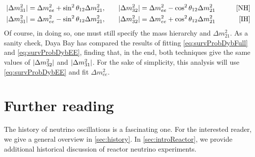 \documentclass[../thesis.tex]{subfiles}
\begin{document}
\begin{align}
  \lvert \Delta m^2_{31}\rvert = \Delta m^2_{ee} + \sin^2 \theta_{12} \Delta m^2_{21}, \qquad
  & \lvert \Delta m^2_{32}\rvert = \Delta m^2_{ee} - \cos^2 \theta_{12} \Delta m^2_{21} \qquad
  & \text{[NH]}\\
  \lvert \Delta m^2_{31}\rvert = \Delta m^2_{ee} - \sin^2 \theta_{12} \Delta m^2_{21}, \qquad
  & \lvert \Delta m^2_{32}\rvert = \Delta m^2_{ee} + \cos^2 \theta_{12} \Delta m^2_{21} \qquad
  & \text{[IH]}
\end{align}
Of course, in doing so, one must still specify the mass hierarchy and \(\Delta m^2_{21}.\) As a sanity check, Daya Bay has compared the results of fitting \autoref{eq:survProbDybFull} and \autoref{eq:survProbDybEE}, finding that, in the end, both techniques give the same values of \(\lvert \Delta m^2_{32}\rvert\) and \(\lvert \Delta m^2_{31}\rvert\). For the sake of simplicity, this analysis will use \autoref{eq:survProbDybEE} and fit \(\Delta m^2_{ee}\).

\section{Further reading}
\label{sec:introFurther}

The history of neutrino oscillations is a fascinating one. For the interested reader, we give a general overview in \autoref{sec:history}. In \autoref{sec:introReactor}, we provide additional historical discussion of reactor neutrino experiments.

\subfilebackmatter
\end{document}
